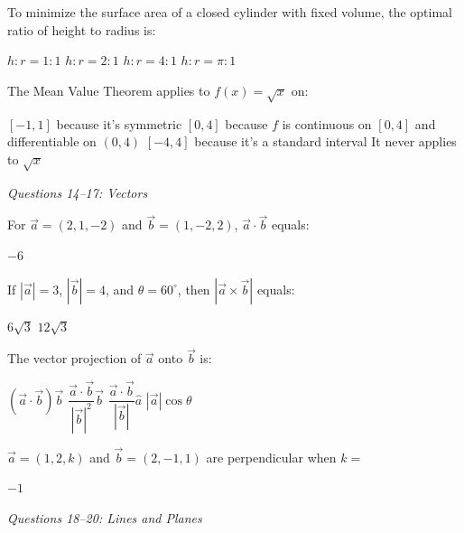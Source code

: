 \documentclass[addpoints]{exam}
\begin{document}
\begin{questions}
\question[1] To minimize the surface area of a closed cylinder with fixed volume, the
optimal ratio of height to radius is:
\begin{choices}
    \choice $h : r = 1 : 1$
    \correctchoice $h : r = 2 : 1$
    \choice $h : r = 4 : 1$
    \choice $h : r = \pi : 1$
\end{choices}

\question[1] The Mean Value Theorem applies to $f(x) = \sqrt{x}$ on:
\begin{choices}
    \choice $[-1, 1]$ because it's symmetric
    \correctchoice $[0, 4]$ because $f$ is continuous on $[0,4]$ and differentiable on $(0,4)$
    \choice $[-4, 4]$ because it's a standard interval
    \choice It never applies to $\sqrt{x}$
\end{choices}

\vspace{3mm}
\noindent\textit{Questions 14--17: Vectors}
\vspace{3mm}

\question[1] For $\vec{a} = (2,1,-2)$ and $\vec{b} = (1,-2,2)$, $\vec{a}\cdot\vec{b}$ equals:
\begin{choices}
    \correctchoice $-6$
\end{choices}

\question[1] If $|\vec{a}| = 3$, $|\vec{b}| = 4$, and $\theta = 60^\circ$, then
$|\vec{a}\times\vec{b}|$ equals:
\begin{choices}
    \correctchoice $6\sqrt{3}$
    \choice $12\sqrt{3}$
\end{choices}

\question[1] The vector projection of $\vec{a}$ onto $\vec{b}$ is:
\begin{choices}
    \choice $(\vec{a}\cdot\vec{b})\vec{b}$
    \correctchoice $\dfrac{\vec{a}\cdot\vec{b}}{|\vec{b}|^2}\vec{b}$
    \choice $\dfrac{\vec{a}\cdot\vec{b}}{|\vec{b}|}\hat{a}$
    \choice $|\vec{a}|\cos\theta$
\end{choices}

\question[1] $\vec{a} = (1,2,k)$ and $\vec{b} = (2,-1,1)$ are perpendicular when $k = $
\begin{choices}
    \choice $-1$
\end{choices}

\vspace{3mm}
\noindent\textit{Questions 18--20: Lines and Planes}
\vspace{3mm}


\end{questions}
\end{document}
